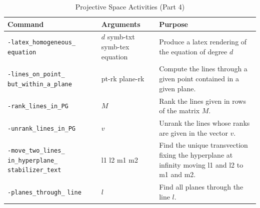 \begin{table}
	\begin{center}
	\begin{tabular}{|p{4cm}|p{3cm}|p{7cm}|}
		\hline
		Command & Arguments & Purpose \\
		\hline
		\hline
		\verb'-latex_homogeneous_' \verb'equation' & $d$ symb-txt symb-tex equation  & 
		Produce a latex rendering of the equation of degree $d$ \\
		\hline
		\verb'-lines_on_point_' \verb'but_within_a_plane' & pt-rk plane-rk  & 
		Compute the lines through a given point contained in a given plane. \\
		\hline
		\verb'-rank_lines_in_PG' & $M$  & Rank the lines given in rows of the matrix $M$. \\
		\hline
		\verb'-unrank_lines_in_PG' & $v$  & Unrank the lines whose ranks are given in the vector $v$. \\
		\hline
		\verb'-move_two_lines_' \verb'in_hyperplane_' \verb'stabilizer_text' & l1 l2 m1 m2  & Find the unique transvection fixing the hyperplane at infinity moving l1 and l2 to m1 and m2. \\
		\hline
		\verb'-planes_through_' \verb'line' & $l$  & Find all planes through the line $l$. \\
		\hline
		\end{tabular}
	\end{center}
	\caption{\label{tab:projective:space:activities:4}Projective Space Activities (Part 4)}
\end{table}


\bigskip



